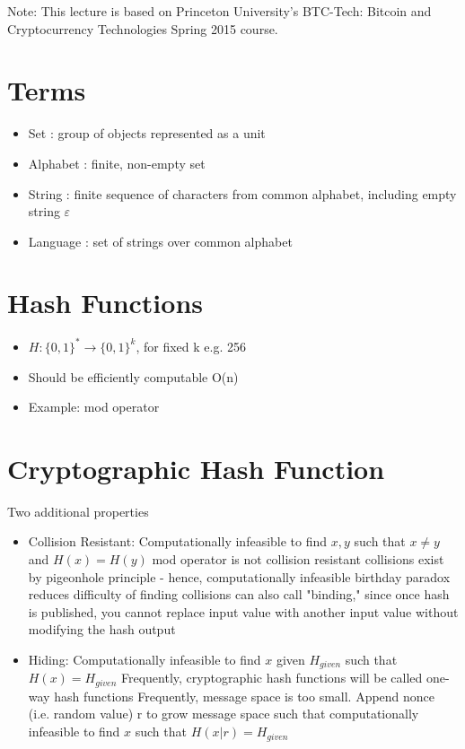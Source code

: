 \documentclass{article}
\begin{document}
\maketitle

Note: This lecture is based on Princeton University's BTC-Tech: Bitcoin and Cryptocurrency Technologies Spring 2015 course.

\section*{Terms}
\begin{itemize}
\item Set : group of objects represented as a unit
\item Alphabet : finite, non-empty set
\item String : finite sequence of characters from common alphabet, including empty string $\varepsilon$
\item Language : set of strings over common alphabet
\end{itemize}

\section*{Hash Functions}
\begin{itemize}
\item $H: \{0,1\}^* \rightarrow \{0,1\}^k$, for fixed k e.g. 256
\item Should be efficiently computable O(n)
\item Example: mod operator
\end{itemize}

\section*{Cryptographic Hash Function}
Two additional properties
\begin{itemize}
\item Collision Resistant: Computationally infeasible to find $x, y$ such that $x \neq y$ and $H(x) = H(y)$
\subitem mod operator is not collision resistant
\subitem collisions exist by pigeonhole principle - hence, computationally infeasible
\subitem birthday paradox reduces difficulty of finding collisions
\subitem can also call "binding," since once hash is published, you cannot replace input value with another input value without modifying the hash output

\item Hiding: Computationally infeasible to find $x$ given $H_{given}$ such that $H(x) = H_{given}$
\subitem Frequently, cryptographic hash functions will be called one-way hash functions
\subitem Frequently, message space is too small. Append nonce (i.e. random value) r to grow message space such that computationally infeasible to find $x$ such that $H(x|r) = H_{given}$

\end{itemize}
\end{document}
